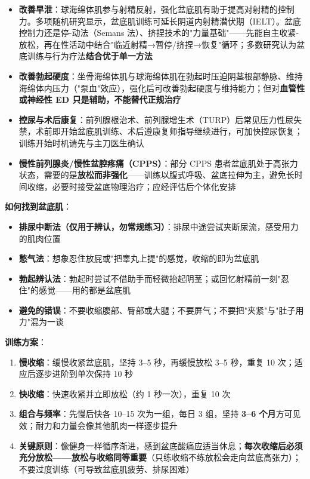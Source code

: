 \documentclass[12pt,a4paper,twoside]{ctexbook}
\begin{document}
\begin{itemize}[leftmargin=2cm]
	\item \textbf{改善早泄}：球海绵体肌参与射精反射，强化盆底肌有助于提高对射精的控制力。多项随机研究显示，盆底肌训练可延长阴道内射精潜伏期（IELT）。盆底控制力还是停-动法（Semans 法）、挤捏技术的"力量基础"——先能自主收紧-放松，再在性活动中结合"临近射精→暂停/挤捏→恢复"循环；多数研究认为盆底训练与行为疗法\textbf{结合优于单一方法}
	\item \textbf{改善勃起硬度}：坐骨海绵体肌与球海绵体肌在勃起时压迫阴茎根部静脉、维持海绵体内压力（"泵血"效应），强化后可改善勃起硬度与维持能力；但对\textbf{血管性或神经性 ED 只是辅助，不能替代正规治疗}
	\item \textbf{控尿与术后康复}：前列腺根治术、前列腺增生术（TURP）后常见压力性尿失禁，术前即开始盆底肌训练、术后遵康复师指导继续进行，可加快控尿恢复；训练开始时机请先与主刀医生确认
	\item \textbf{慢性前列腺炎/慢性盆腔疼痛（CPPS）}：部分 CPPS 患者盆底肌处于高张力状态，需要的是\textbf{放松而非强化}——训练以腹式呼吸、盆底拉伸为主，避免长时间收缩，必要时接受盆底物理治疗；应经评估后个体化安排
\end{itemize}

\vspace{0.5em}
\noindent\textbf{如何找到盆底肌}：

\begin{itemize}[leftmargin=2cm]
	\item \textbf{排尿中断法（仅用于辨认，勿常规练习）}：排尿中途尝试夹断尿流，感受用力的肌肉位置
	\item \textbf{憋气法}：想象忍住放屁或"把睾丸上提"的感觉，收缩的即为盆底肌
	\item \textbf{勃起辨认法}：勃起时尝试不借助手而轻微抬起阴茎；或回忆射精前一刻"忍住"的感觉——用的都是盆底肌
	\item \textbf{避免的错误}：不要收缩腹部、臀部或大腿；不要屏气；不要把"夹紧"与"肚子用力"混为一谈
\end{itemize}

\vspace{0.5em}
\noindent\textbf{训练方案}：

\begin{enumerate}
	\item \textbf{慢收缩}：缓慢收紧盆底肌，坚持 3--5 秒，再缓慢放松 3--5 秒，重复 10 次；适应后逐步进阶到单次保持 10 秒
	\item \textbf{快收缩}：快速收紧并立即放松（约 1 秒一次），重复 10 次
	\item \textbf{组合与频率}：先慢后快各 10--15 次为一组，每日 3 组，坚持 \textbf{3--6 个月}方可见效；耐力和力量会像其他肌肉一样逐步提升
	\item \textbf{关键原则}：像健身一样循序渐进，感到盆底酸痛应适当休息；\textbf{每次收缩后必须充分放松——放松与收缩同等重要}（只练收缩不练放松会走向盆底高张力）；不要过度训练（可导致盆底肌疲劳、排尿困难）
\end{enumerate}
\end{document}
